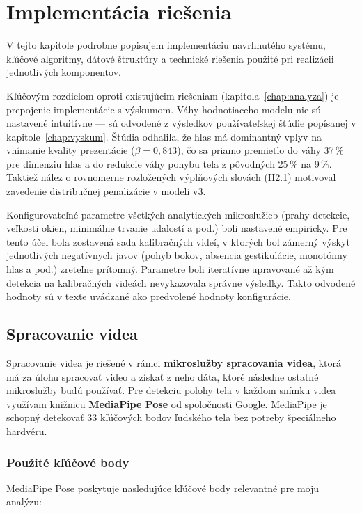 \chapter{Implementácia riešenia}

V tejto kapitole podrobne popisujem implementáciu navrhnutého systému, kľúčové algoritmy, dátové štruktúry a technické riešenia použité pri realizácii jednotlivých komponentov.

Kľúčovým rozdielom oproti existujúcim riešeniam (kapitola~\ref{chap:analyza}) je prepojenie implementácie s výskumom.
Váhy hodnotiaceho modelu nie sú nastavené intuitívne --- sú odvodené z výsledkov používateľskej štúdie popísanej v kapitole~\ref{chap:vyskum}.
Štúdia odhalila, že hlas má dominantný vplyv na vnímanie kvality prezentácie ($\beta = 0{,}843$), čo sa priamo premietlo do váhy 37\,\% pre dimenziu hlas a do redukcie váhy pohybu tela z pôvodných 25\,\% na 9\,\%.
Taktiež nález o rovnomerne rozložených výplňových slovách (H2.1) motivoval zavedenie distribučnej penalizácie v modeli v3.

Konfigurovateľné parametre všetkých analytických mikroslužieb (prahy detekcie, veľkosti okien, minimálne trvanie udalostí a pod.) boli nastavené empiricky. Pre tento účel bola zostavená sada kalibračných videí, v ktorých bol zámerný výskyt jednotlivých negatívnych javov (pohyb bokov, absencia gestikulácie, monotónny hlas a pod.) zreteľne prítomný.
Parametre boli iteratívne upravované až kým detekcia na kalibračných videách nevykazovala správne výsledky.
Takto odvodené hodnoty sú v texte uvádzané ako predvolené hodnoty konfigurácie.

\section{Spracovanie videa}

Spracovanie videa je riešené v rámci \textbf{mikroslužby spracovania videa}, ktorá má za úlohu spracovať video a získať z neho dáta,
ktoré následne ostatné mikroslužby budú používať.
Pre detekciu polohy tela v každom snímku videa využívam knižnicu \textbf{MediaPipe Pose} od spoločnosti Google.
MediaPipe je schopný detekovať 33 kľúčových bodov ľudského tela bez potreby špeciálneho hardvéru.\cite{mediapipe}

\subsection{Použité kľúčové body}

MediaPipe Pose poskytuje nasledujúce kľúčové body relevantné pre moju analýzu:

